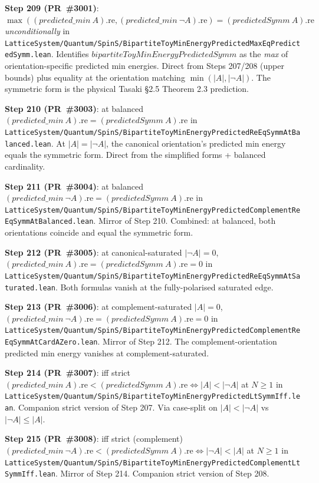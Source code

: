 \documentclass[a4paper,11pt]{article}
\begin{document}
\textbf{Step 209 (PR~\#3001)}: $\max((predicted\_min\ A).\mathrm{re},
(predicted\_min\ \neg A).\mathrm{re}) = (predictedSymm\ A).\mathrm{re}$
\emph{unconditionally} in
\texttt{LatticeSystem/Quantum/SpinS/BipartiteToyMinEnergyPredictedMaxEqPredictedSymm.lean}.
Identifies $bipartiteToyMinEnergyPredictedSymm$ as the \emph{max} of
orientation-specific predicted min energies. Direct from Steps 207/208
(upper bounds) plus equality at the orientation matching
$\min(|A|, |\neg A|)$. The symmetric form is the physical Tasaki §2.5
Theorem 2.3 prediction.

\textbf{Step 210 (PR~\#3003)}: at balanced
$(predicted\_min\ A).\mathrm{re} = (predictedSymm\ A).\mathrm{re}$ in
\texttt{LatticeSystem/Quantum/SpinS/BipartiteToyMinEnergyPredictedReEqSymmAtBalanced.lean}.
At $|A| = |\neg A|$, the canonical orientation's predicted min energy
equals the symmetric form. Direct from the simplified forms + balanced
cardinality.

\textbf{Step 211 (PR~\#3004)}: at balanced
$(predicted\_min\ \neg A).\mathrm{re} = (predictedSymm\ A).\mathrm{re}$
in
\texttt{LatticeSystem/Quantum/SpinS/BipartiteToyMinEnergyPredictedComplementReEqSymmAtBalanced.lean}.
Mirror of Step 210. Combined: at balanced, both orientations coincide
and equal the symmetric form.

\textbf{Step 212 (PR~\#3005)}: at canonical-saturated $|\neg A| = 0$,
$(predicted\_min\ A).\mathrm{re} = (predictedSymm\ A).\mathrm{re} = 0$
in
\texttt{LatticeSystem/Quantum/SpinS/BipartiteToyMinEnergyPredictedReEqSymmAtSaturated.lean}.
Both formulas vanish at the fully-polarised saturated edge.

\textbf{Step 213 (PR~\#3006)}: at complement-saturated $|A| = 0$,
$(predicted\_min\ \neg A).\mathrm{re} = (predictedSymm\ A).\mathrm{re} = 0$
in
\texttt{LatticeSystem/Quantum/SpinS/BipartiteToyMinEnergyPredictedComplementReEqSymmAtCardAZero.lean}.
Mirror of Step 212. The complement-orientation predicted min energy
vanishes at complement-saturated.

\textbf{Step 214 (PR~\#3007)}: iff strict
$(predicted\_min\ A).\mathrm{re} < (predictedSymm\ A).\mathrm{re}
\Leftrightarrow |A| < |\neg A|$ at $N \ge 1$ in
\texttt{LatticeSystem/Quantum/SpinS/BipartiteToyMinEnergyPredictedLtSymmIff.lean}.
Companion strict version of Step 207. Via case-split on
$|A| < |\neg A|$ vs $|\neg A| \le |A|$.

\textbf{Step 215 (PR~\#3008)}: iff strict (complement)
$(predicted\_min\ \neg A).\mathrm{re} < (predictedSymm\ A).\mathrm{re}
\Leftrightarrow |\neg A| < |A|$ at $N \ge 1$ in
\texttt{LatticeSystem/Quantum/SpinS/BipartiteToyMinEnergyPredictedComplementLtSymmIff.lean}.
Mirror of Step 214. Companion strict version of Step 208.
\end{document}
